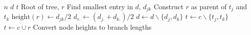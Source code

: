   \begin{algorithmic}[1]
    \REQUIRE $n$ 
    \REQUIRE $d$ 
    \REQUIRE $t$ 
    \ENSURE Root of tree, $r$
    \STATE Find smallest entry in $d$, $d_{jk}$
    \STATE Construct $r$ as parent of $t_j$ and $t_k$
    \STATE $\mbox{height}(r)\leftarrow d_{jk}/2$
    \STATE $d_{r.}\leftarrow (d_{j.}+d_{k.})/2$
    \STATE $d\leftarrow d\backslash\{d_j,d_k\}$
    \STATE $t\leftarrow c\backslash\{t_j,t_k\}$
    \STATE $t\leftarrow c\cup r$
    \ENDFOR
    \STATE Convert node heights to branch lengths
\end{algorithmic}
